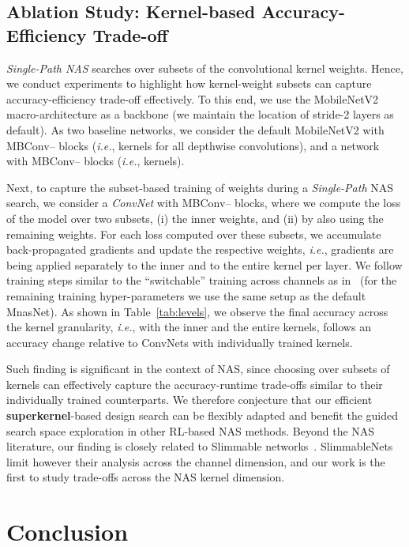 \documentclass[runningheads]{llncs}
\begin{document}
\subsection{Ablation Study: Kernel-based Accuracy-Efficiency Trade-off}

\textit{Single-Path NAS} searches over subsets of
the convolutional kernel weights. Hence, we conduct experiments to 
highlight how kernel-weight subsets can capture 
accuracy-efficiency trade-off effectively. To this end,
we use the MobileNetV2 macro-architecture as a backbone (we maintain the 
location of stride-2 layers as default). As two baseline networks, 
we consider the default MobileNetV2 with MBConv-- blocks 
(\textit{i.e.},  kernels for all depthwise convolutions), 
and a network with MBConv-- blocks (\textit{i.e.},  
kernels).

Next, to capture the subset-based training of weights during a \textit{Single-Path} 
NAS search, we consider a \textit{ConvNet} with MBConv-- blocks, where we 
compute the loss of the model over two subsets, 
(i) the inner  weights, and (ii) by also using the 
remaining  
weights. For each loss computed over these subsets, we accumulate back-propagated 
gradients and update the respective weights, \textit{i.e.}, gradients are being 
applied separately to the inner and to the entire kernel per layer. We
follow training steps similar to the ``switchable'' 
training across channels as in~\cite{yu2018slimmable} (for the remaining 
training hyper-parameters we use the same setup as the default MnasNet).
As shown in Table~\ref{tab:levels}, we observe the final accuracy
across the kernel granularity, \textit{i.e.}, with the 
inner  and the 
entire  kernels, 
follows an accuracy change relative to ConvNets with
individually trained kernels. 

Such finding is significant in the context of NAS, since choosing over 
subsets of kernels can effectively capture the accuracy-runtime trade-offs 
similar to their individually trained counterparts. We therefore conjecture that
our efficient \textbf{superkernel}-based design search can be flexibly adapted 
and benefit the guided search space exploration in other RL-based
NAS methods. Beyond the NAS literature, our finding is closely 
related to Slimmable networks~\cite{yu2018slimmable}. SlimmableNets
limit however their analysis across the channel dimension, and 
our work is the first to study trade-offs across the NAS kernel dimension.


\section{Conclusion}
\end{document}
